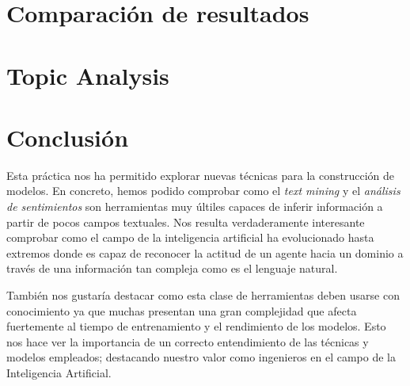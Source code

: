 \documentclass[es]{uc3mreport}
\begin{document}
\begin{report}
\section{Comparación de resultados}
\label{chap:resultados}

\section{Topic Analysis}
\label{chap:topic}

\section{Conclusión}
\label{chap:conclusion}

Esta práctica nos ha permitido explorar nuevas técnicas para la construcción de modelos. En concreto, hemos podido comprobar como el \textit{text mining} y el \textit{análisis de sentimientos} son herramientas muy últiles capaces de inferir información a partir de pocos campos textuales. Nos resulta verdaderamente interesante comprobar como el campo de la inteligencia artificial ha evolucionado hasta extremos donde es capaz de reconocer la actitud de un agente hacia un dominio a través de una información tan compleja como es el lenguaje natural.

También nos gustaría destacar como esta clase de herramientas deben usarse con conocimiento ya que muchas presentan una gran complejidad que afecta fuertemente al tiempo de entrenamiento y el rendimiento de los modelos. Esto nos hace ver la importancia de un correcto entendimiento de las técnicas y modelos empleados; destacando nuestro valor como ingenieros en el campo de la Inteligencia Artificial.

  \end{report}


  \label{bibliography}
  \printbibliography[title={Bibliografía}]  %

\end{document}
